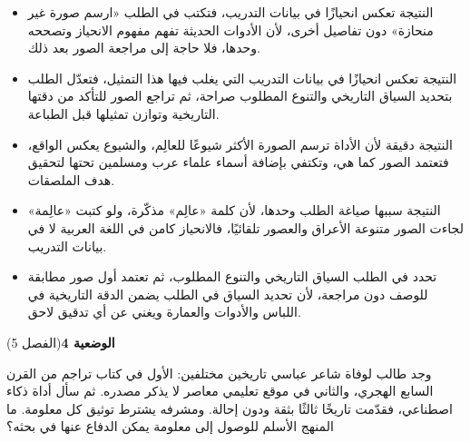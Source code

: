 \documentclass[11pt,a4paper]{article}
\begin{document}
\begin{itemize}[leftmargin=1.0cm, labelsep=6pt, itemsep=3pt, topsep=4pt, parsep=0pt]
  \item[\textbf{أ)}] النتيجة تعكس انحيازًا في بيانات التدريب، فتكتب في الطلب «ارسم صورة غير منحازة» دون تفاصيل أخرى، لأن الأدوات الحديثة تفهم مفهوم الانحياز وتصححه وحدها، فلا حاجة إلى مراجعة الصور بعد ذلك.
  \item[\textbf{ب)}] النتيجة تعكس انحيازًا في بيانات التدريب التي يغلب فيها هذا التمثيل، فتعدّل الطلب بتحديد السياق التاريخي والتنوع المطلوب صراحة، ثم تراجع الصور للتأكد من دقتها التاريخية وتوازن تمثيلها قبل الطباعة.
  \item[\textbf{ج)}] النتيجة دقيقة لأن الأداة ترسم الصورة الأكثر شيوعًا للعالِم، والشيوع يعكس الواقع، فتعتمد الصور كما هي، وتكتفي بإضافة أسماء علماء عرب ومسلمين تحتها لتحقيق هدف الملصقات.
  \item[\textbf{د)}] النتيجة سببها صياغة الطلب وحدها، لأن كلمة «عالِم» مذكّرة، ولو كتبت «عالِمة» لجاءت الصور متنوعة الأعراق والعصور تلقائيًا، فالانحياز كامن في اللغة العربية لا في بيانات التدريب.
  \item[\textbf{هـ)}] تحدد في الطلب السياق التاريخي والتنوع المطلوب، ثم تعتمد أول صور مطابقة للوصف دون مراجعة، لأن تحديد السياق في الطلب يضمن الدقة التاريخية في اللباس والأدوات والعمارة ويغني عن أي تدقيق لاحق.
\end{itemize}
\par\vspace{6pt}
\noindent
{\large\khatt\textbf{الوضعية 4}}\hfill{\small(الفصل 5)}\par\nopagebreak\vspace{3pt}
\setlength{\fboxsep}{7pt}\colorbox{gray!10}{\parbox{\dimexpr\linewidth-14pt}{وجد طالب لوفاة شاعر عباسي تاريخين مختلفين: الأول في كتاب تراجم من القرن السابع الهجري، والثاني في موقع تعليمي معاصر لا يذكر مصدره. ثم سأل أداة ذكاء اصطناعي، فقدّمت تاريخًا ثالثًا بثقة ودون إحالة. ومشرفه يشترط توثيق كل معلومة. ما المنهج الأسلم للوصول إلى معلومة يمكن الدفاع عنها في بحثه؟}}\par\nopagebreak
\end{document}
